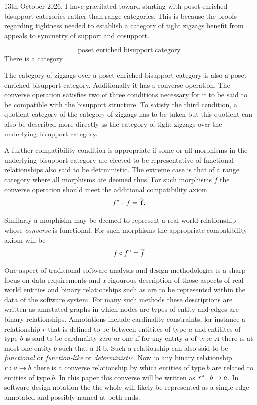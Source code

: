 \begin{aside}
13th October 2026. I have gravitated toward starting with 
poset-enriched bisupport categories rather than range categories. 
This is  because the proofs regarding tightness needed
to establish a category of tight zigzags 
benefit from appeals to symmetry of support and cosupport. 

\begin{equation}
\label{posetEnrichedBisupportCategory}
\text{poset enriched bisupport category}
\end{equation}
There is a category .

The category of zigzags over a poset enriched bisupport category
is also a poset enriched bisupport category. Additionally it has a converse operation. 
The converse operation  satisfies two of three conditions necessary for it to be
said to be compatible with the bisupport structure.
To satisfy the third condition, a quotient category of the category of zigzags has to be taken but this quotient can also be described more directly 
as the category of tight zigzags over the underlying bisupport category.

A further compatibility condition is appropriate if some or all morphisms in the underlying bisupport category are elected to be representative of functional
relationships also said to be detrministic. The extreme case is that of a range category where all morphisms are deemed thus. For such morphisms $f$ the converse operation should meet the additional compatibility axiom
\[
\converse{f} \circ f = \rng{f}.
\]

Similarly a morphisim may be deemed to represent a real world relationship whose \textit{converse} is functional. For such morphisms the appropriate compatibility axiom will be
\[
f \circ \converse{f} = \rst{f}
\]

One aspect of traditional software analysis and design methodologies 
is a sharp focus on data requirements 
and a rigourous description of 
those aspects of real-world entities and binary relationships 
such as are to be represented 
within the data of the software system. 
For many such methods these descriptions are written as 
annotated graphs in which nodes are types of entity and edges are binary relationships. Annotations include cardinality constraints, for instance a relationship $r$ that is defined to be between entitites of type $a$ and entitites of type $b$ is said to be cardinality zero-or-one if for any entity $a$ of type $A$ there is at most one entity $b$ such that a R b.
Such a relationship can also said to be \textit{functional} or \textit{function-like} or \textit{deterministic}. 
Now to any binary relationship $r: a \rightarrow b$ there is a converse relationship by which entities of type $b$ are related to entities of type $b$. 
In this paper this converse 
will be written as ${r}^\circ : b \rightarrow a$. 
In software design notation the the whole will likely be represented as a single edge annotated and possibly named at both ends. 


\end{aside}
